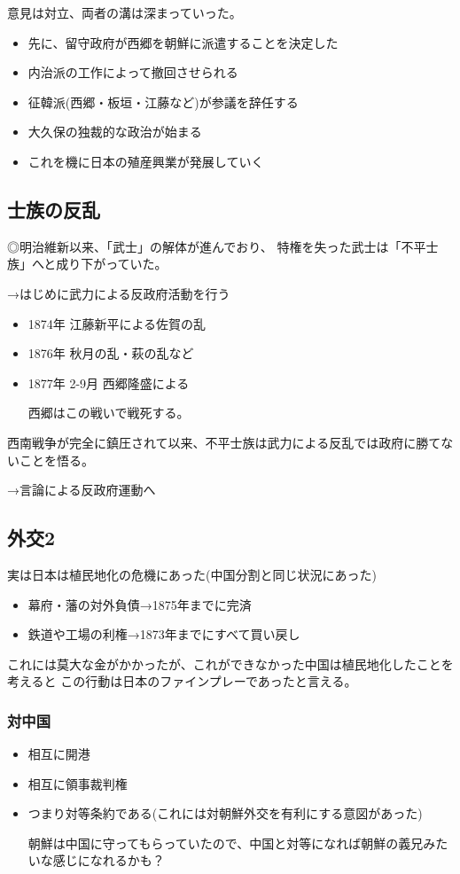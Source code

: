 \documentclass[12pt,fleqn]{ltjsarticle}
\begin{document}
意見は対立、両者の溝は深まっていった。

\begin{itemize}
\item 先に、留守政府が西郷を朝鮮に派遣することを決定した
\item 内治派の工作によって撤回させられる
\item 征韓派(西郷・板垣・江藤など)が参議を辞任する
\end{itemize}

\begin{itemize}
\item 大久保の独裁的な政治が始まる
\item これを機に日本の殖産興業が発展していく
\end{itemize}

\subsection{士族の反乱}
◎明治維新以来、「武士」の解体が進んでおり、
特権を失った武士は「不平士族」へと成り下がっていた。

→はじめに武力による反政府活動を行う
\begin{itemize}
\item 1874年 江藤新平による佐賀の乱
\item 1876年 秋月の乱・萩の乱など
\item 1877年 2-9月 西郷隆盛による

西郷はこの戦いで戦死する。
\end{itemize}

西南戦争が完全に鎮圧されて以来、不平士族は武力による反乱では政府に勝てないことを悟る。

→言論による反政府運動へ

\subsection{外交2}
実は日本は植民地化の危機にあった(中国分割と同じ状況にあった)

\begin{itemize}
\item 幕府・藩の対外負債→1875年までに完済
\item 鉄道や工場の利権→1873年までにすべて買い戻し
\end{itemize}
これには莫大な金がかかったが、これができなかった中国は植民地化したことを考えると
この行動は日本のファインプレーであったと言える。

\subsubsection{対中国}
\begin{itemize}
\item 相互に開港
\item 相互に領事裁判権
\item つまり対等条約である(これには対朝鮮外交を有利にする意図があった)

朝鮮は中国に守ってもらっていたので、中国と対等になれば朝鮮の義兄みたいな感じになれるかも？
\end{itemize}
\end{document}
